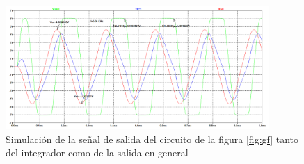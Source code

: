 \begin{enumerate}
\begin{itemize}
                        \begin{figure}[H]
                            \centering
                            \renewcommand{\figurename}{Gráfica}
                            \setcounter{figure}{12}  
                            \includegraphics[width=10cm]{Imagenes/sim_gf.png}
                            \caption{Simulación de la señal de salida del circuito de la figura \ref{fig:gf} tanto del integrador como de la salida en general}
                            \label{fig:sim_gf}
                        \end{figure}

                \end{itemize}
                
            
        \end{enumerate}




    
\newpage

